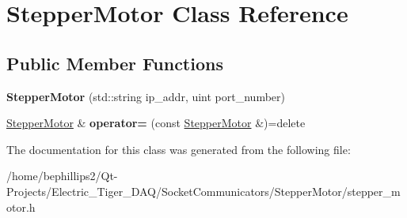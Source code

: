 \hypertarget{class_stepper_motor}{}\section{Stepper\+Motor Class Reference}
\label{class_stepper_motor}
\subsection*{Public Member Functions}
\begin{DoxyCompactItemize}
\item 
{\bfseries Stepper\+Motor} (std\+::string ip\+\_\+addr, uint port\+\_\+number)\hypertarget{class_stepper_motor_a60b5baede3214f0774dd4fe166ab6bd5}{}\label{class_stepper_motor_a60b5baede3214f0774dd4fe166ab6bd5}

\item 
\hyperlink{class_stepper_motor}{Stepper\+Motor} \& {\bfseries operator=} (const \hyperlink{class_stepper_motor}{Stepper\+Motor} \&)=delete\hypertarget{class_stepper_motor_aeeceb8eefbcffef0cb0c2b742ffe3603}{}\label{class_stepper_motor_aeeceb8eefbcffef0cb0c2b742ffe3603}

\end{DoxyCompactItemize}


The documentation for this class was generated from the following file\+:\begin{DoxyCompactItemize}
\item 
/home/bephillips2/\+Qt-\/\+Projects/\+Electric\+\_\+\+Tiger\+\_\+\+D\+A\+Q/\+Socket\+Communicators/\+Stepper\+Motor/stepper\+\_\+motor.\+h\end{DoxyCompactItemize}
